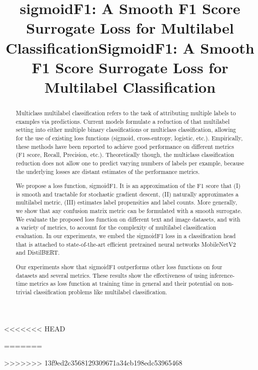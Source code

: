 \documentclass[sigconf,natbib,screen=true,review=true,anonymous]{acmart}
\begin{document}
<<<<<<< HEAD
\title[sigmoidF1: A Smooth F1 Score Surrogate Loss for Multilabel Classification]{sigmoidF1: A Smooth F1 Score Surrogate Loss for Multilabel Classification}
=======
\title[SigmoidF1: A Smooth F1 Score Surrogate Loss for Multilabel Classification]{SigmoidF1: A Smooth F1 Score Surrogate Loss for Multilabel Classification}
>>>>>>> 13f9ed2c3568129309671a34cb198edc53965468


\begin{abstract}

  Multiclass multilabel classification refers to the task of attributing multiple labels to examples via predictions. Current models formulate a reduction of that multilabel setting into either multiple binary classifications or multiclass classification, allowing for the use of existing loss functions (sigmoid, cross-entropy, logistic, etc.). Empirically, these methods have been reported to achieve good performance on different metrics (F1 score, Recall, Precision, etc.). Theoretically though, the multiclass classification reduction does not allow one to predict varying numbers of labels per example, because the underlying losses are distant estimates of the performance metrics.

  We propose a loss function, sigmoidF1. It is an approximation of the F1 score that (I) is smooth and tractable for stochastic gradient descent, (II) naturally approximates a multilabel metric, (III) estimates label propensities and label counts. More generally, we show that any confusion matrix metric can be formulated with a smooth surrogate. We evaluate the proposed loss function on different text and image datasets, and with a variety of metrics, to account for the complexity of multilabel classification evaluation. In our experiments, we embed the sigmoidF1 loss in a classification head that is attached to state-of-the-art efficient pretrained neural networks MobileNetV2 and DistilBERT.

Our experiments show that sigmoidF1 outperforms other loss functions on four datasets and several metrics. These results show the effectiveness of using inference-time metrics as loss function at training time in general and their potential on non-trivial classification problems like multilabel classification.


\end{abstract}
\end{document}
